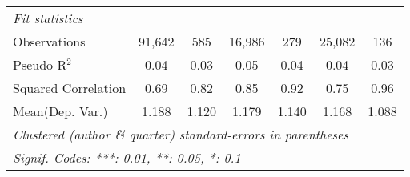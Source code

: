\begin{tabular}{lcccccc}
   \midrule
   \emph{Fit statistics}\\
   Observations                                               & 91,642       & 585           & 16,986       & 279     & 25,082         & 136\\  
   Pseudo R$^2$                                               & 0.04         & 0.03          & 0.05         & 0.04    & 0.04           & 0.03\\  
   Squared Correlation                                        & 0.69         & 0.82          & 0.85         & 0.92    & 0.75           & 0.96\\  
Mean(Dep. Var.) & 1.188 & 1.120 & 1.179 & 1.140 & 1.168 & 1.088 \\
   \midrule \midrule
   \multicolumn{7}{l}{\emph{Clustered (author \& quarter) standard-errors in parentheses}}\\
   \multicolumn{7}{l}{\emph{Signif. Codes: ***: 0.01, **: 0.05, *: 0.1}}\\
\end{tabular}
\par\endgroup
